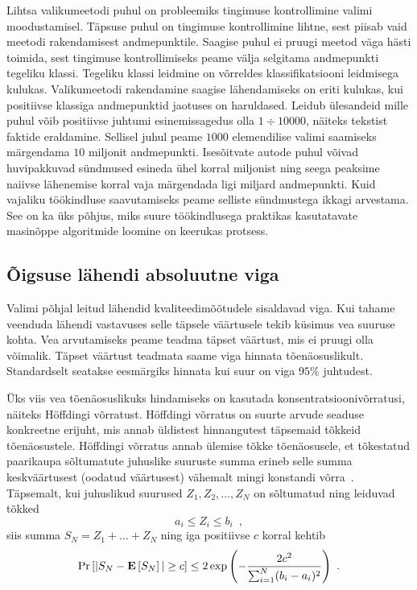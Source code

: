 Lihtsa valikumeetodi puhul on probleemiks tingimuse kontrollimine valimi moodustamisel. Täpsuse puhul on tingimuse kontrollimine lihtne, sest piisab vaid meetodi rakendamisest andmepunktile. Saagise puhul ei pruugi meetod väga hästi toimida, sest tingimuse kontrollimiseks peame välja selgitama andmepunkti tegeliku klassi. Tegeliku klassi leidmine on võrreldes klassifikatsiooni leidmisega kulukas. Valikumeetodi rakendamine saagise lähendamiseks on eriti kulukas, kui positiivse klassiga andmepunktid jaotuses on haruldased. Leidub ülesandeid mille puhul võib positiivse juhtumi esinemissagedus olla $1 \div 10 000$, näiteks tekstist faktide eraldamine. Sellisel juhul peame $1 000$ elemendilise valimi saamiseks märgendama $10$ miljonit andmepunkti. Isesõitvate autode puhul võivad huvipakkuvad sündmused esineda ühel korral miljonist ning seega peaksime naiivse lähenemise korral vaja märgendada ligi miljard andmepunkti. Kuid vajaliku töökindluse saavutamiseks peame selliste sündmustega ikkagi arvestama. See on ka üks põhjus, miks suure töökindlusega praktikas kasutatavate masinõppe algoritmide loomine on keerukas protsess.

\subsection{Õigsuse lähendi absoluutne viga}
Valimi põhjal leitud lähendid kvaliteedimõõtudele sisaldavad viga. Kui tahame veenduda lähendi vastavuses selle täpsele väärtusele tekib küsimus vea suuruse kohta. Vea arvutamiseks peame teadma täpset väärtust, mis ei pruugi olla võimalik. Täpset väärtust teadmata saame viga hinnata tõenäosuslikult. Standardselt seatakse eesmärgiks hinnata kui suur on viga $95\%$ juhtudest.

Üks viis vea tõenäosuslikuks hindamiseks on kasutada konsentratsioonivõrratusi, näiteks Höffdingi võrratust. Höffdingi võrratus on suurte arvude seaduse konkreetne erijuht, mis annab üldistest hinnangutest täpsemaid tõkkeid tõenäosustele. Höffdingi võrratus annab ülemise tõkke tõenäosusele, et tõkestatud paarikaupa sõltumatute juhuslike suuruste summa erineb selle summa keskväärtusest (oodatud väärtusest) vähemalt mingi konstandi võrra~\cite{höffdingi-võrratus,tõenäosusteooria-2-loengukonspekt}. Täpsemalt, kui juhuslikud suurused $Z_1, Z_2, \dots, Z_N$ on sõltumatud ning leiduvad tõkked
\begin{equation*}
    a_i \leq Z_i \leq b_i \enspace, 
\end{equation*}
siis summa $S_N = Z_1 + \dots + Z_N$ ning iga positiivse $c$ korral kehtib
\begin{equation*}
    \Pr\left[| S_N - \operatorname*{\mathbf{E}}\left[S_N\right] | \geq c\right] \leq 2 \exp{\left( -\frac{2 c^2}{\sum_{i = 1}^{N}(b_i - a_i)^2}\right)} \enspace.
\end{equation*}

